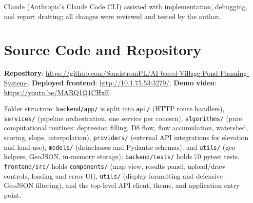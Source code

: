 \documentclass[manuscript,screen]{acmart}
\begin{document}
Claude (Anthropic's Claude Code CLI) assisted with implementation, debugging,
and report drafting; all changes were reviewed and tested by the author.

\appendix

\section{Source Code and Repository}
\textbf{Repository}: \url{https://github.com/SandstromPL/AI-based-Village-Pond-Planning-System-}.
\textbf{Deployed frontend}: \url{http://10.1.75.53:3279/}.
\textbf{Demo video}: \url{https://youtu.be/MARQ1Q1CHxE}.

Folder structure: \texttt{backend/app/} is split into \texttt{api/}
(HTTP route handlers), \texttt{services/} (pipeline orchestration, one
service per concern), \texttt{algorithms/} (pure computational routines:
depression filling, D8 flow, flow accumulation, watershed, scoring,
slope, interpolation), \texttt{providers/} (external API integrations for
elevation and land-use), \texttt{models/} (dataclasses and Pydantic
schemas), and \texttt{utils/} (geo helpers, GeoJSON, in-memory storage);
\texttt{backend/tests/} holds 70 pytest tests. \texttt{frontend/src/}
holds \texttt{components/} (map view, results panel, upload/draw
controls, loading and error UI), \texttt{utils/} (display formatting and
defensive GeoJSON filtering), and the top-level API client, theme, and
application entry point.
\end{document}
